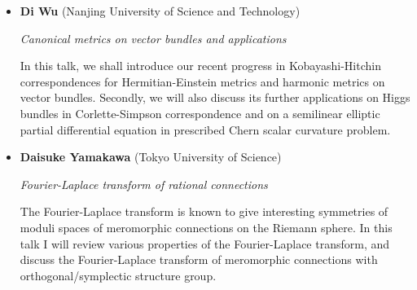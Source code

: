 \documentclass{article}
\begin{document}
\begin{itemize}




\item {\bf Di Wu} (Nanjing University of Science and Technology)

{\it Canonical metrics on vector bundles and applications}

In this talk, we shall introduce our recent progress in Kobayashi-Hitchin correspondences for Hermitian-Einstein metrics and harmonic metrics on vector bundles. Secondly, we will also discuss its further applications on Higgs bundles in Corlette-Simpson correspondence and on a semilinear elliptic partial differential equation in prescribed Chern scalar curvature problem. 

\item {\bf Daisuke Yamakawa} (Tokyo University of Science)

{\it Fourier-Laplace transform of rational connections}

The Fourier-Laplace transform is known to give interesting symmetries of moduli spaces of meromorphic connections on the Riemann sphere. In this talk I will review various properties of the Fourier-Laplace transform, and discuss the Fourier-Laplace transform of meromorphic connections with orthogonal/symplectic structure group.

\end{itemize}
\end{document}
